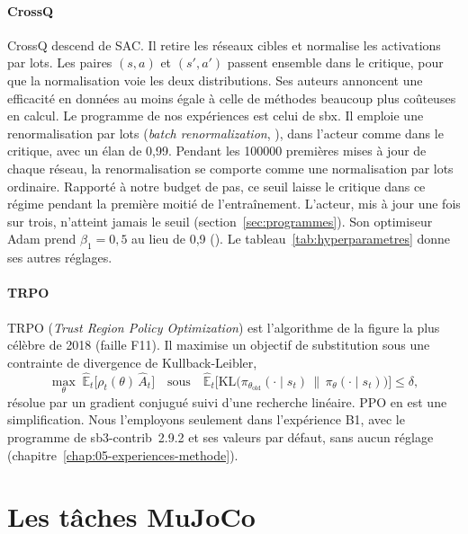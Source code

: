 \paragraph{CrossQ}
CrossQ \parencite{bhatt2024crossq} descend de SAC. Il retire les réseaux cibles et normalise les
activations par lots. Les paires $(s, a)$ et $(s', a')$ passent ensemble dans le critique, pour que la
normalisation voie les deux distributions. Ses auteurs annoncent une efficacité en données au moins
égale à celle de méthodes beaucoup plus coûteuses en calcul. Le programme  de nos
expériences est celui de sbx. Il emploie une renormalisation par lots (\emph{batch renormalization}, \cite{ioffe2017batchrenorm}),
dans l'acteur comme dans le critique, avec un élan de 0,99. Pendant les \num{100000} premières mises à jour
de chaque réseau, la renormalisation se comporte comme une normalisation par lots ordinaire. Rapporté à
notre budget de pas, ce seuil laisse le critique dans ce régime pendant la première moitié de
l'entraînement. L'acteur, mis à jour une fois sur trois, n'atteint jamais le seuil
(section~\ref{sec:programmes}). Son optimiseur
Adam prend $\beta_1 = 0{,}5$ au lieu de 0,9 (). Le tableau~\ref{tab:hyperparametres}
donne ses autres réglages.

\paragraph{TRPO}
TRPO (\emph{Trust Region Policy Optimization}) \parencite{schulman2015trpo} est l'algorithme de la
figure la plus célèbre de 2018 (faille F11). Il maximise un objectif de substitution sous une
contrainte de divergence de Kullback-Leibler,
\begin{equation}
  \max_\theta\; \hat{\mathbb{E}}_t\bigl[ \rho_t(\theta)\, \hat{A}_t \bigr]
  \quad \text{sous} \quad
  \hat{\mathbb{E}}_t\bigl[ \mathrm{KL}\bigl( \pi_{\theta_\text{old}}(\cdot \mid s_t) \,\big\|\, \pi_\theta(\cdot \mid s_t) \bigr) \bigr] \leq \delta,
\end{equation}
résolue par un gradient conjugué suivi d'une recherche linéaire. PPO en est une simplification. Nous
l'employons seulement dans l'expérience B1, avec le programme de sb3-contrib~2.9.2 et ses valeurs par
défaut, sans aucun réglage (chapitre~\ref{chap:05-experiences-methode}).

\section{Les tâches MuJoCo}\label{sec:ctx-taches}

